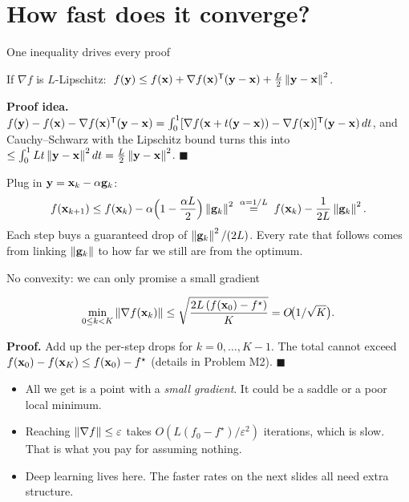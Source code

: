 \section{How fast does it converge?}

\begin{frame}{One inequality drives every proof}
  \begin{thmbox}
    If $\nabla f$ is $L$-Lipschitz: $\;f(\mathbf{y})\le f(\mathbf{x})+\nabla f(\mathbf{x})^{\mathsf T}(\mathbf{y}-\mathbf{x})+\tfrac L2\left\lVert \mathbf{y}-\mathbf{x} \right\rVert^2$.
  \end{thmbox}
  \small
  \textbf{Proof idea.}
  \pause
  $f(\mathbf{y})-f(\mathbf{x})-\nabla f(\mathbf{x})^{\mathsf T}(\mathbf{y}-\mathbf{x}) = \int_0^1[\nabla f(\mathbf{x}+t(\mathbf{y}-\mathbf{x}))-\nabla f(\mathbf{x})]^{\mathsf T}(\mathbf{y}-\mathbf{x})\,dt$,
  \pause
  and Cauchy--Schwarz with the Lipschitz bound turns this into $\le\int_0^1 Lt\left\lVert \mathbf{y}-\mathbf{x} \right\rVert^2dt = \tfrac L2\left\lVert \mathbf{y}-\mathbf{x} \right\rVert^2$. $\blacksquare$

  \pause
  \vspace{4pt}
  \normalsize Plug in $\mathbf{y} = \mathbf{x}_k - \alpha\mathbf{g}_k$:
  \[
    f(\mathbf{x}_{k+1}) \le f(\mathbf{x}_k) - \alpha\Bigl(1 - \frac{\alpha L}2\Bigr)\left\lVert \mathbf{g}_k \right\rVert^2
    \;\overset{\alpha = 1/L}{=}\; f(\mathbf{x}_k) - \frac{1}{2L}\left\lVert \mathbf{g}_k \right\rVert^2 .
  \]
  \small Each step buys a guaranteed drop of $\left\lVert \mathbf{g}_k \right\rVert^2/(2L)$. Every rate that follows comes from linking
  $\left\lVert \mathbf{g}_k \right\rVert$ to how far we still are from the optimum.
\end{frame}

\begin{frame}{No convexity: we can only promise a small gradient}
  \begin{thmbox}[Theorem ($L$-smooth, bounded below, $\alpha = 1/L$)]
    \[
      \min_{0\le k<K}\left\lVert \nabla f(\mathbf{x}_k) \right\rVert \le \sqrt{\frac{2L\,(f(\mathbf{x}_0)-f^\star)}{K}} = O\!\bigl(1/\sqrt K\bigr).
    \]
  \end{thmbox}
  \small\textbf{Proof.} Add up the per-step drops for $k = 0,\dots,K-1$. The total cannot exceed
  $f(\mathbf{x}_0) - f(\mathbf{x}_K)\le f(\mathbf{x}_0)-f^\star$ (details in Problem M2). $\blacksquare$
  \begin{itemize}\small
    \item All we get is a point with a \emph{small gradient}. It could be a saddle or a poor local minimum.
    \item Reaching $\left\lVert \nabla f \right\rVert\le\varepsilon$ takes $O(L(f_0-f^\star)/\varepsilon^2)$ iterations, which is slow.
          That is what you pay for assuming nothing.
    \item Deep learning lives here. The faster rates on the next slides all need extra structure.
  \end{itemize}
\end{frame}


